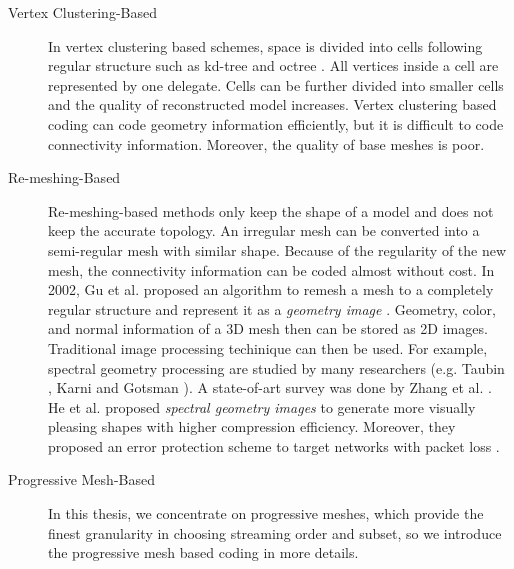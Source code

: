     \begin{description}
        \item[Vertex Clustering-Based] 
            In vertex clustering based schemes, space is divided into cells
            following regular structure such as kd-tree \cite{566591} and 
            octree \cite{1073237}. All vertices inside a cell are represented
            by one delegate. Cells can be further divided into smaller cells
            and the quality of reconstructed model increases. Vertex clustering
            based coding can code geometry information efficiently, but it is 
            difficult to code connectivity information. Moreover, the quality
            of base meshes is poor.

        \item[Re-meshing-Based]
            Re-meshing-based methods only keep the shape of a model
            and does not keep the accurate topology. 
            An irregular mesh can be converted into a semi-regular mesh
            with similar shape. 
            Because of the regularity of the new mesh,
            the connectivity information can be coded almost without cost.
            In 2002, Gu et al. proposed an algorithm to remesh a
            mesh to a completely regular structure and represent it 
            as a \emph{geometry image} \cite{gu:geometry}. 
            Geometry, color, and normal information
            of a 3D mesh then can be stored as 2D images.
            Traditional image processing techinique can then be used.
            For example, spectral geometry processing are studied by many researchers
            (e.g. Taubin \cite{taubin:signal}, Karni and Gotsman \cite{karni:spectral}).
            A state-of-art survey was done by Zhang et al. \cite{zhang:spectral}.
            He et al. proposed \emph{spectral geometry images} to generate more 
            visually pleasing shapes with higher compression efficiency. Moreover, 
            they proposed an error protection scheme to target networks with 
            packet loss \cite{he:spectral}.

        \item[Progressive Mesh-Based]
            In this thesis, we concentrate on progressive meshes, which provide 
            the finest granularity in choosing streaming order and subset, 
            so we introduce the progressive mesh based coding in more details.
    \end{description}

